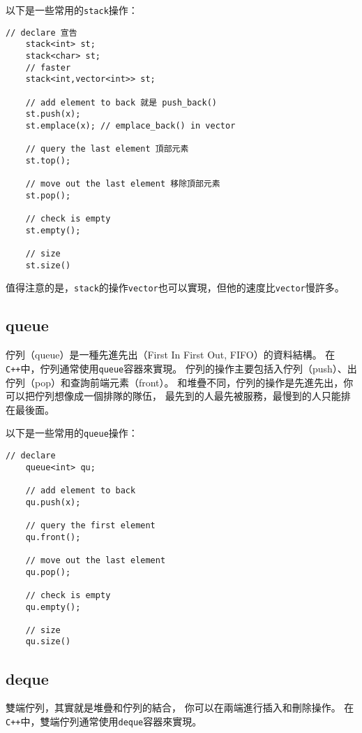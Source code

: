     以下是一些常用的\texttt{stack}操作：

    \begin{lstlisting}[caption=stack 用法]
    // declare 宣告
    stack<int> st;
    stack<char> st;
    // faster
    stack<int,vector<int>> st;

    // add element to back 就是 push_back()
    st.push(x);
    st.emplace(x); // emplace_back() in vector

    // query the last element 頂部元素
    st.top();

    // move out the last element 移除頂部元素
    st.pop();

    // check is empty
    st.empty();

    // size
    st.size()
    \end{lstlisting}
    值得注意的是，\texttt{stack}的操作\texttt{vector}也可以實現，但他的速度比\texttt{vector}慢許多。


    \subsection{queue}

    佇列（queue）是一種先進先出（First In First Out, FIFO）的資料結構。
    在\texttt{C++}中，佇列通常使用\texttt{queue}容器來實現。
    佇列的操作主要包括入佇列（push）、出佇列（pop）和查詢前端元素（front）。
    和堆疊不同，佇列的操作是先進先出，你可以把佇列想像成一個排隊的隊伍，
    最先到的人最先被服務，最慢到的人只能排在最後面。

    以下是一些常用的\texttt{queue}操作：

    \begin{lstlisting}[caption=queue 用法]
    // declare
    queue<int> qu;

    // add element to back
    qu.push(x);

    // query the first element
    qu.front();

    // move out the last element
    qu.pop();

    // check is empty
    qu.empty();

    // size
    qu.size()
    \end{lstlisting}

    \subsection{deque}

    雙端佇列，其實就是堆疊和佇列的結合，
    你可以在兩端進行插入和刪除操作。
    在\texttt{C++}中，雙端佇列通常使用\texttt{deque}容器來實現。

